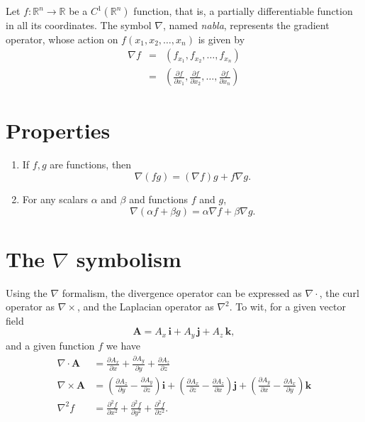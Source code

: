 \documentclass[12pt]{article}
\newcommand{\lp}{\left(}
\newcommand{\rp}{\right)}
\newcommand{\vi}{\mathbf{i}}
\newcommand{\vj}{\mathbf{j}}
\newcommand{\vk}{\mathbf{k}}
\newcommand{\vA}{\mathbf{A}}
\begin{document}
Let $f:\mathbb{R}^n\to \mathbb{R}$ be a 
$C^1(\mathbb{R}^n)$ function, that is, a partially differentiable 
function in all its coordinates. The symbol $\nabla$, named 
\emph{nabla}, represents the gradient operator, whose action on $f(x_1,x_2,\ldots,x_n)$ is given  by
\begin{eqnarray*}
\nabla f&=&\left(f_{x_1},f_{x_2},\ldots,f_{x_n}\right)\\
&=&\left(
\frac{\partial f}{\partial x_1},\frac{\partial f}{\partial x_2},\ldots,\frac{\partial f}{\partial x_n}
\right)
\end{eqnarray*}

\section*{Properties}
\begin{enumerate}
\item If $f,g$ are functions, then 
\[
   \nabla(fg) = (\nabla f) g + f \nabla g.
\]
\item For any scalars $\alpha$ and $\beta$ and functions $f$ and $g$,
\[
   \nabla(\alpha f + \beta g) = \alpha \nabla f + \beta \nabla g.
\]
\end{enumerate}

\section*{The $\nabla$ symbolism}
Using the $\nabla$ formalism,
the divergence operator can be expressed as
$\nabla\cdot$, the curl operator as $\nabla\times$, and the
Laplacian operator as $\nabla^2$. To wit, for a given vector field
\[
\vA = A_x\, \vi + A_y\, \vj + A_z\, \vk,
\]
and a given function $f$
we have
\begin{align*}
\nabla\cdot \vA &= \frac{\partial A_x}{\partial x} +
\frac{\partial A_y}{\partial y} +\frac{\partial A_z}{\partial z} \\
\nabla\times \vA &=
\lp\frac{\partial A_z}{\partial y} - \frac{\partial A_y}{\partial z}
\rp \vi+
\lp \frac{\partial A_x}{\partial z} -
\frac{\partial A_z}{\partial x}\rp \vj+
\lp \frac{\partial A_y}{\partial x} -
\frac{\partial A_x}{\partial y}\rp \vk\\
\nabla^2 f &= \frac{\partial^2 f}{\partial x^2} +
\frac{\partial^2 f}{\partial y^2} +\frac{\partial^2 f}{\partial z^2}.
\end{align*}
\end{document}
